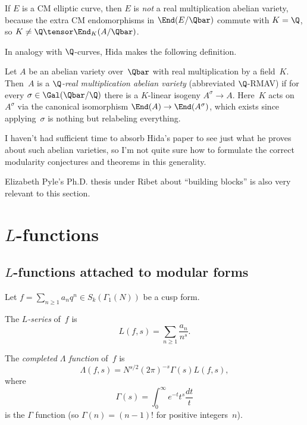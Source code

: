 \documentclass{report}
\begin{document}
If $E$ is a CM elliptic curve, then $E$ is {\em not} a
real multiplication abelian variety, because the extra
CM endomorphisms in $\End(E/\Qbar)$ commute with $K=\Q$,
so $K \neq \Q\tensor\End_{K}(A/\Qbar)$.

In analogy with $\Q$-curves, Hida makes the following
definition.
\begin{definition}[$\Q$-RMAV]
  Let $A$ be an abelian variety over~$\Qbar$ with real
  multiplication by a field~$K$.  Then~$A$ is a {\em $\Q$-real
    multiplication abelian variety} (abbreviated $\Q$-RMAV) if for
  every $\sigma\in\Gal(\Qbar/\Q)$ there is a $K$-linear isogeny
  $A^{\sigma} \to A$.  Here~$K$ acts on $A^{\sigma}$ via the canonical
  isomorphism $\End(A) \to \End(A^{\sigma})$, which exists since
  applying~$\sigma$ is nothing but relabeling everything.
\end{definition}

I haven't had sufficient time to absorb Hida's paper to see just what
he proves about such abelian varieties, so I'm not quite sure how to
formulate the correct modularity conjectures and theorems in this
generality.

Elizabeth Pyle's Ph.D. thesis \cite{pyle:thesis} under Ribet about
``building blocks'' is also very relevant to this section.


\chapter{$L$-functions}

\section{$L$-functions attached to modular forms}
Let $f=\sum_{n\geq 1} a_n q^n\in S_k(\Gamma_1(N))$ be a cusp form.
\begin{definition}[$L$-series]
\label{defn:lseries_f}
The {\em $L$-series} of~$f$ is
$$
   L(f,s) = \sum_{n\geq 1} \frac{a_n}{n^s}.
$$
\end{definition}

\begin{definition}
\label{defn:lambda_f}
The {\em completed $\Lambda$ function} of~$f$ is
$$
   \Lambda(f,s) = N^{s/2} (2\pi)^{-s} \Gamma(s) L(f,s),
$$
where
$$
  \Gamma(s) = \int_{0}^{\infty} e^{-t} t^s \frac{dt}{t}
$$
is the $\Gamma$ function (so $\Gamma(n)=(n-1)!$ for positive
integers~$n$).
\end{definition}
\end{document}
